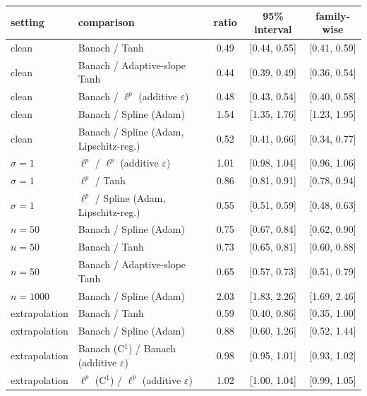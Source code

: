 \begin{tabular}{llccc}
\toprule
setting & comparison & ratio & 95\% interval & family-wise \\
\midrule
clean & Banach / Tanh & 0.49 & [0.44, 0.55] & [0.41, 0.59] \\
clean & Banach / Adaptive-slope Tanh & 0.44 & [0.39, 0.49] & [0.36, 0.54] \\
clean & Banach / $\ell^p$ (additive $\varepsilon$) & 0.48 & [0.43, 0.54] & [0.40, 0.58] \\
clean & Banach / Spline (Adam) & 1.54 & [1.35, 1.76] & [1.23, 1.95] \\
clean & Banach / Spline (Adam, Lipschitz-reg.) & 0.52 & [0.41, 0.66] & [0.34, 0.77] \\
$\sigma=1$ & $\ell^p$ / $\ell^p$ (additive $\varepsilon$) & 1.01 & [0.98, 1.04] & [0.96, 1.06] \\
$\sigma=1$ & $\ell^p$ / Tanh & 0.86 & [0.81, 0.91] & [0.78, 0.94] \\
$\sigma=1$ & $\ell^p$ / Spline (Adam, Lipschitz-reg.) & 0.55 & [0.51, 0.59] & [0.48, 0.63] \\
$n=50$ & Banach / Spline (Adam) & 0.75 & [0.67, 0.84] & [0.62, 0.90] \\
$n=50$ & Banach / Tanh & 0.73 & [0.65, 0.81] & [0.60, 0.88] \\
$n=50$ & Banach / Adaptive-slope Tanh & 0.65 & [0.57, 0.73] & [0.51, 0.79] \\
$n=1000$ & Banach / Spline (Adam) & 2.03 & [1.83, 2.26] & [1.69, 2.46] \\
\midrule
extrapolation & Banach / Tanh & 0.59 & [0.40, 0.86] & [0.35, 1.00] \\
extrapolation & Banach / Spline (Adam) & 0.88 & [0.60, 1.26] & [0.52, 1.44] \\
extrapolation & Banach (C$^1$) / Banach (additive $\varepsilon$) & 0.98 & [0.95, 1.01] & [0.93, 1.02] \\
extrapolation & $\ell^p$ (C$^1$) / $\ell^p$ (additive $\varepsilon$) & 1.02 & [1.00, 1.04] & [0.99, 1.05] \\
\bottomrule
\end{tabular}

